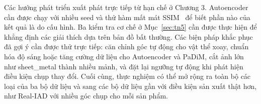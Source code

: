 Các hướng phát triển xuất phát trực tiếp từ hạn chế ở Chương 3. Autoencoder cần được chạy với nhiều seed và thử
hàm mất mát SSIM~\cite{bergmannImprovingUnsupervisedDefect2019} để biết phần nào của kết quả là do cấu hình. Ba kiểm
tra cơ chế ở Mục~\ref{sec:tn5} cần được thực hiện để khẳng định các giải thích dựa trên bản đồ bất thường. Các biện
pháp khắc phục đã gợi ý cần được thử trực tiếp: căn chỉnh góc tự động cho vật thể xoay, chuẩn hóa độ sáng hoặc tăng
cường dữ liệu cho Autoencoder và PaDiM, cắt ảnh lớn như sheet\_metal thành nhiều mảnh, và đặt lại ngưỡng tự động khi
phát hiện điều kiện chụp thay đổi. Cuối cùng, thực nghiệm có thể mở rộng ra toàn bộ các loại của ba bộ dữ liệu và
sang các bộ dữ liệu gần với điều kiện sản xuất thật hơn, như Real-IAD với nhiều góc chụp cho mỗi sản phẩm.
